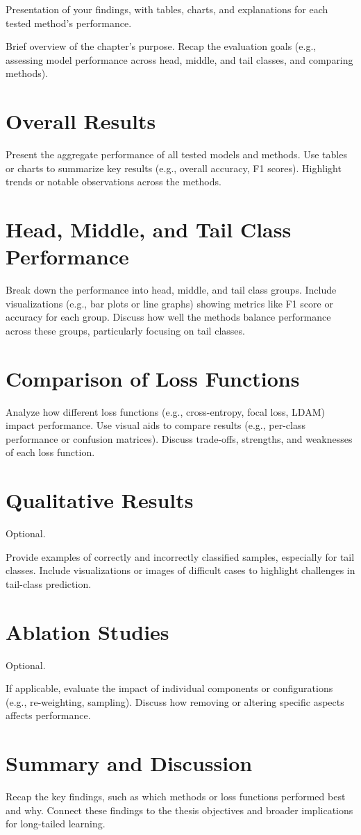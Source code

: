 
Presentation of your findings, with tables, charts, and explanations for each tested method's performance.

Brief overview of the chapter’s purpose.
Recap the evaluation goals (e.g., assessing model performance across head, middle, and tail classes, and comparing methods).

\section{Overall Results}

Present the aggregate performance of all tested models and methods.
Use tables or charts to summarize key results (e.g., overall accuracy, F1 scores).
Highlight trends or notable observations across the methods.

\section{Head, Middle, and Tail Class Performance}
Break down the performance into head, middle, and tail class groups.
Include visualizations (e.g., bar plots or line graphs) showing metrics like F1 score or accuracy for each group.
Discuss how well the methods balance performance across these groups, particularly focusing on tail classes.

\section{Comparison of Loss Functions}
Analyze how different loss functions (e.g., cross-entropy, focal loss, LDAM) impact performance.
Use visual aids to compare results (e.g., per-class performance or confusion matrices).
Discuss trade-offs, strengths, and weaknesses of each loss function.

\section{Qualitative Results}
Optional.

Provide examples of correctly and incorrectly classified samples, especially for tail classes.
Include visualizations or images of difficult cases to highlight challenges in tail-class prediction.

\section{Ablation Studies}
Optional.

If applicable, evaluate the impact of individual components or configurations (e.g., re-weighting, sampling).
Discuss how removing or altering specific aspects affects performance.

\section{Summary and Discussion}
Recap the key findings, such as which methods or loss functions performed best and why.
Connect these findings to the thesis objectives and broader implications for long-tailed learning.